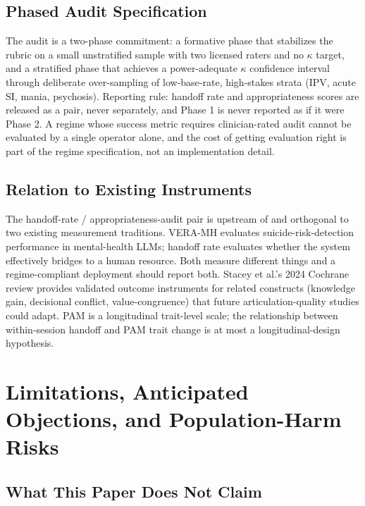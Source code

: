 \documentclass[letterpaper]{article}
\begin{document}
\subsection{Phased Audit Specification}

The audit is a two-phase commitment: a formative phase that stabilizes the rubric on a small unstratified sample with two licensed raters and no $\kappa$ target, and a stratified phase that achieves a power-adequate $\kappa$ confidence interval through deliberate over-sampling of low-base-rate, high-stakes strata (IPV, acute SI, mania, psychosis). Reporting rule: handoff rate and appropriateness scores are released as a pair, never separately, and Phase 1 is never reported as if it were Phase 2. A regime whose success metric requires clinician-rated audit cannot be evaluated by a single operator alone, and the cost of getting evaluation right is part of the regime specification, not an implementation detail.

\subsection{Relation to Existing Instruments}

The handoff-rate / appropriateness-audit pair is upstream of and orthogonal to two existing measurement traditions. VERA-MH \citep{belli2025veramh} evaluates suicide-risk-detection performance in mental-health LLMs; handoff rate evaluates whether the system effectively bridges to a human resource. Both measure different things and a regime-compliant deployment should report both. Stacey et al.'s 2024 Cochrane review \citep{stacey2024cochrane} provides validated outcome instruments for related constructs (knowledge gain, decisional conflict, value-congruence) that future articulation-quality studies could adapt. PAM \citep{hibbard2004pam} is a longitudinal trait-level scale; the relationship between within-session handoff and PAM trait change is at most a longitudinal-design hypothesis.

\section{Limitations, Anticipated Objections, and Population-Harm Risks}

\subsection{What This Paper Does Not Claim}
\end{document}
